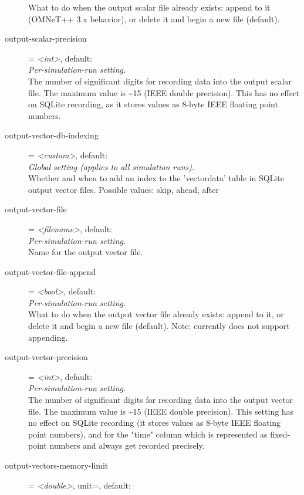 \begin{description}
    What to do when the output scalar file already exists: append to it
    (OMNeT++ 3.x behavior), or delete it and begin a new file (default).
\item[output-scalar-precision] = \textit{<int>}, default: \\
    \textit{Per-simulation-run setting.}\\
    The number of significant digits for recording data into the output scalar
    file. The maximum value is {\textasciitilde}15 (IEEE double precision).
    This has no effect on SQLite recording, as it stores values as 8-byte IEEE
    floating point numbers.
\item[output-vector-db-indexing] = \textit{<custom>}, default: \\
    \textit{Global setting (applies to all simulation runs).}\\
    Whether and when to add an index to the 'vectordata' table in SQLite output
    vector files. Possible values: skip, ahead, after
\item[output-vector-file] = \textit{<filename>}, default: \\
    \textit{Per-simulation-run setting.}\\
    Name for the output vector file.
\item[output-vector-file-append] = \textit{<bool>}, default: \\
    \textit{Per-simulation-run setting.}\\
    What to do when the output vector file already exists: append to it, or
    delete it and begin a new file (default). Note:
     currently does not support
    appending.
\item[output-vector-precision] = \textit{<int>}, default: \\
    \textit{Per-simulation-run setting.}\\
    The number of significant digits for recording data into the output vector
    file. The maximum value is {\textasciitilde}15 (IEEE double precision).
    This setting has no effect on SQLite recording (it stores values as 8-byte
    IEEE floating point numbers), and for the "time" column which is
    represented as fixed-point numbers and always get recorded precisely.
\item[output-vectors-memory-limit] = \textit{<double>}, unit=, default: \\

\end{description}
